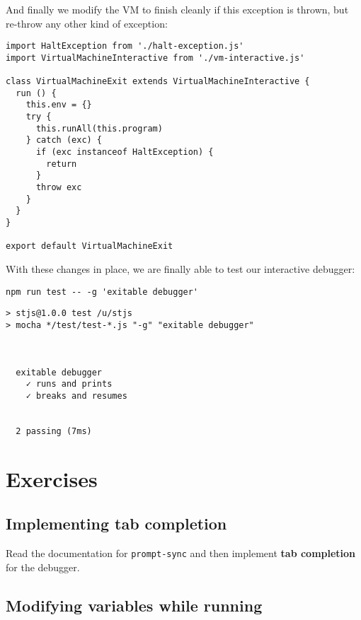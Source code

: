 \documentclass[krantzl]{krantz}
\newcommand{\glossref}[1]{\textbf{#1}}
\begin{document}
\noindent And finally
we modify the VM to finish cleanly if this exception is thrown,
but re-throw any other kind of exception:


\begin{lstlisting}[frame=tblr]
import HaltException from './halt-exception.js'
import VirtualMachineInteractive from './vm-interactive.js'

class VirtualMachineExit extends VirtualMachineInteractive {
  run () {
    this.env = {}
    try {
      this.runAll(this.program)
    } catch (exc) {
      if (exc instanceof HaltException) {
        return
      }
      throw exc
    }
  }
}

export default VirtualMachineExit
\end{lstlisting}



With these changes in place,
we are finally able to test our interactive debugger:


\begin{lstlisting}[frame=shadowbox]
npm run test -- -g 'exitable debugger'
\end{lstlisting}



\begin{lstlisting}[frame=tblr,backgroundcolor=\color{black!5}]
> stjs@1.0.0 test /u/stjs
> mocha */test/test-*.js "-g" "exitable debugger"



  exitable debugger
    ✓ runs and prints
    ✓ breaks and resumes


  2 passing (7ms)
\end{lstlisting}


\section{Exercises}\label{debugger-exercises}

\subsection*{Implementing tab completion}


Read the documentation for \texttt{prompt-sync}
and then implement \glossref{tab completion}
for the debugger.

\subsection*{Modifying variables while running}
\end{document}
